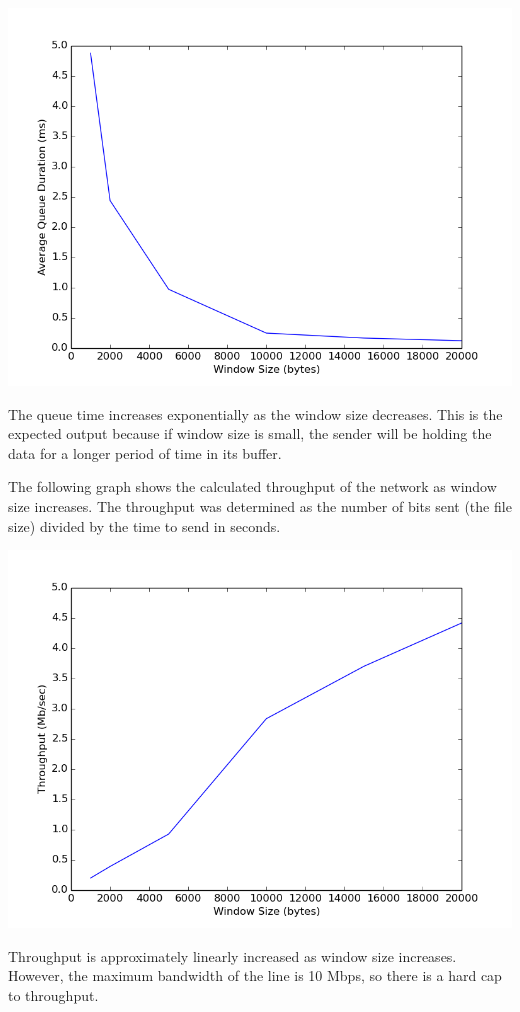 \documentclass[11pt]{article}
\begin{document}
\includegraphics[width=17cm]{outputs/lab2_queue.png}

The queue time increases exponentially as the window size decreases. This is the expected output because if window size is small, the sender will be holding the data for a longer period of time in its buffer.

The following graph shows the calculated throughput of the network as window size increases. The throughput was determined as the number of bits sent (the file size) divided by the time to send in seconds.

\includegraphics[width=17cm]{outputs/lab2_throughput.png}

Throughput is approximately linearly increased as window size increases. However, the maximum bandwidth of the line is 10 Mbps, so there is a hard cap to throughput.
\end{document}
